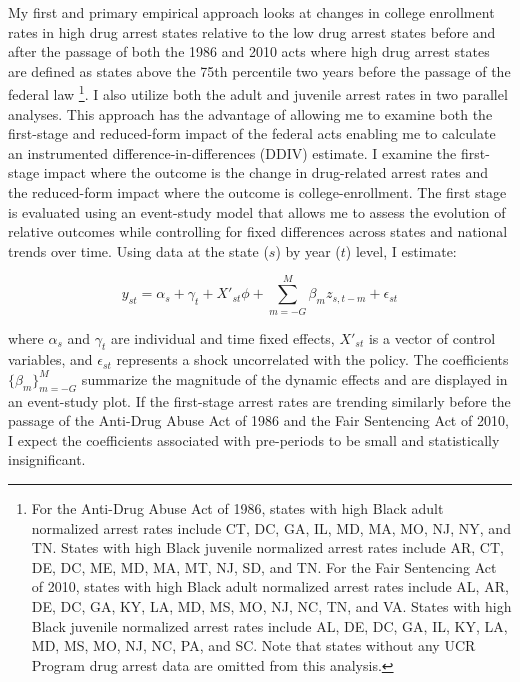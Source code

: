 \documentclass{article}
\begin{document}
My first and primary empirical approach looks at changes in college enrollment rates in high drug arrest states relative to the low drug arrest states before and after the passage of both the 1986 and 2010 acts where high drug arrest states are defined as states above the 75th percentile two years before the passage of the federal law \footnote{For the Anti-Drug Abuse Act of 1986, states with high Black adult normalized arrest rates include CT, DC, GA, IL, MD, MA, MO, NJ, NY, and TN. States with high Black juvenile normalized arrest rates include AR, CT, DE, DC, ME, MD, MA, MT, NJ, SD, and TN. For the Fair Sentencing Act of 2010, states with high Black adult normalized arrest rates include AL, AR, DE, DC, GA, KY, LA, MD, MS, MO, NJ, NC, TN, and VA. States with high Black juvenile normalized arrest rates include AL, DE, DC, GA, IL, KY, LA, MD, MS, MO, NJ, NC, PA, and SC. Note that states without any UCR Program drug arrest data are omitted from this analysis.}. I also utilize both the adult and juvenile arrest rates in two parallel analyses. This approach has the advantage of allowing me to examine both the first-stage and reduced-form impact of the federal acts enabling me to calculate an instrumented difference-in-differences (DDIV) estimate. I examine the first-stage impact where the outcome is the change in drug-related arrest rates and the reduced-form impact where the outcome is college-enrollment. The first stage is evaluated using an event-study model that allows me to assess the evolution of relative outcomes while controlling for fixed differences across states and national trends over time. Using data at the state ($s$) by year ($t$) level, I estimate:

\begin{equation} \label{eq:state_level_es}
  y_{st} = \alpha_s + \gamma_t + X'_{st} \phi + \sum_{m=-G}^{M} \beta_m z_{s,t-m} + \epsilon_{st}
\end{equation}

where $\alpha_s$ and $\gamma_t$ are individual and time fixed effects, $X'_{st}$ is a vector of control variables, and $\epsilon_{st}$ represents a shock uncorrelated with the policy. The coefficients $\{\beta_m \}^{M}_{m=-G}$ summarize the magnitude of the dynamic effects and are displayed in an event-study plot. If the first-stage arrest rates are trending similarly before the passage of the Anti-Drug Abuse Act of 1986 and the Fair Sentencing Act of 2010, I expect the coefficients associated with pre-periods to be small and statistically insignificant.
\end{document}

